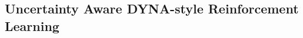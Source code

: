 \documentclass[
reprint,nofootinbib,
amsmath,amssymb,amsfonts,clevref,
aps,
prstab,
]{revtex4-2}
\begin{document}
	
	\subsection{Uncertainty Aware DYNA-style Reinforcement Learning}\label{ss:Uncertainty aware DYNA-style reinforcement learning}
	
\end{document}
